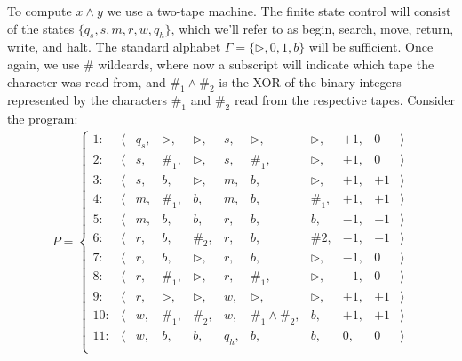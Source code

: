 To compute $x\wedge y$ we use a two-tape machine.  The finite state control will consist of the states $\{q_s, s, m, r, w, q_h\}$, which we'll refer to as begin, search, move, return, write, and halt.  The standard alphabet $\Gamma=\{\triangleright, 0, 1, b\}$ will be sufficient.  Once again, we use $\#$ wildcards, where now a subscript will indicate which tape the character was read from, and $\#_1\wedge\#_2$ is the XOR of the binary integers represented by the characters $\#_1$ and $\#_2$ read from the respective tapes.  Consider the program:
\begin{align*}
P=\left\{
\begin{array}{ccccccccrrr}     1: &\langle&q_s,&\triangleright,&\triangleright,&s,&\triangleright,&\triangleright,&+1,&0&\rangle\\
       2: &\langle&s,&\#_1,&\triangleright,&s,&\#_1,&\triangleright,&+1,&0&\rangle\\
       3: &\langle&s,&b,&\triangleright,&m,&b,&\triangleright,&+1,&+1&\rangle\\
       4: &\langle&m,&\#_1,&b,&m,&b,&\#_1,&+1,&+1&\rangle\\
       5: &\langle&m,&b,&b,&r,&b,&b,&-1,&-1&\rangle\\
       6: &\langle&r,&b,&\#_2,&r,&b,&\#2,&-1,&-1&\rangle\\
       7: &\langle&r,&b,&\triangleright,&r,&b,&\triangleright,&-1,&0&\rangle\\
       8: &\langle&r,&\#_1,&\triangleright,&r,&\#_1,&\triangleright,&-1,&0&\rangle\\
       9: &\langle&r,&\triangleright,&\triangleright,&w,&\triangleright,&\triangleright,&+1,&+1&\rangle\\
       10: &\langle&w,&\#_1,&\#_2,&w,&\#_1\wedge\#_2,&b,&+1,&+1&\rangle\\
       11: &\langle&w,&b,&b,&q_h,&b,&b,&0,&0&\rangle\\
       \end{array}\right.
\end{align*}
